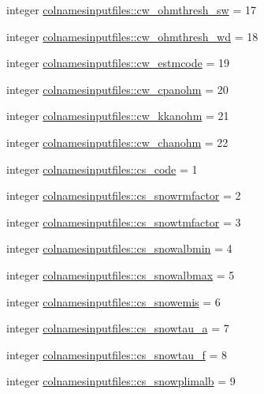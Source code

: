 \begin{DoxyCompactItemize}
\item 
integer \hyperlink{namespacecolnamesinputfiles_a91c1cfc11c36cc14dc389c3664349b80}{colnamesinputfiles\+::cw\+\_\+ohmthresh\+\_\+sw} = 17
\item 
integer \hyperlink{namespacecolnamesinputfiles_a7c61afe733a883743d6acd47ad304165}{colnamesinputfiles\+::cw\+\_\+ohmthresh\+\_\+wd} = 18
\item 
integer \hyperlink{namespacecolnamesinputfiles_ab2ef5113c4b88c851e8380f8ba776c9f}{colnamesinputfiles\+::cw\+\_\+estmcode} = 19
\item 
integer \hyperlink{namespacecolnamesinputfiles_a72895e9c084cfee18f83ca866ff41964}{colnamesinputfiles\+::cw\+\_\+cpanohm} = 20
\item 
integer \hyperlink{namespacecolnamesinputfiles_aa5a9a495f9118eac239b3ab993cd3a0a}{colnamesinputfiles\+::cw\+\_\+kkanohm} = 21
\item 
integer \hyperlink{namespacecolnamesinputfiles_a3d8db86209697e2247d1053c33bbd801}{colnamesinputfiles\+::cw\+\_\+chanohm} = 22
\item 
integer \hyperlink{namespacecolnamesinputfiles_a1252e22c70ac9a8361c876e3a670d98b}{colnamesinputfiles\+::cs\+\_\+code} = 1
\item 
integer \hyperlink{namespacecolnamesinputfiles_a40dacb0faac015e28c7aca1d922a2573}{colnamesinputfiles\+::cs\+\_\+snowrmfactor} = 2
\item 
integer \hyperlink{namespacecolnamesinputfiles_a5b893589e831ca1ee86ff6450bc194b7}{colnamesinputfiles\+::cs\+\_\+snowtmfactor} = 3
\item 
integer \hyperlink{namespacecolnamesinputfiles_a6a42003295839c9ac986d8d3dc5f0f8f}{colnamesinputfiles\+::cs\+\_\+snowalbmin} = 4
\item 
integer \hyperlink{namespacecolnamesinputfiles_a77a8855e90b784c501216ca710b7ad17}{colnamesinputfiles\+::cs\+\_\+snowalbmax} = 5
\item 
integer \hyperlink{namespacecolnamesinputfiles_a9978a0f122304a4b30c14876c95ff5c8}{colnamesinputfiles\+::cs\+\_\+snowemis} = 6
\item 
integer \hyperlink{namespacecolnamesinputfiles_aea5e42e1d69a641bb42d77a33d715624}{colnamesinputfiles\+::cs\+\_\+snowtau\+\_\+a} = 7
\item 
integer \hyperlink{namespacecolnamesinputfiles_a9c63b9dd71fdf3284587e06e17216808}{colnamesinputfiles\+::cs\+\_\+snowtau\+\_\+f} = 8
\item 
integer \hyperlink{namespacecolnamesinputfiles_a4d946b1a7c6e10bb47990af08034d91d}{colnamesinputfiles\+::cs\+\_\+snowplimalb} = 9

\end{DoxyCompactItemize}
